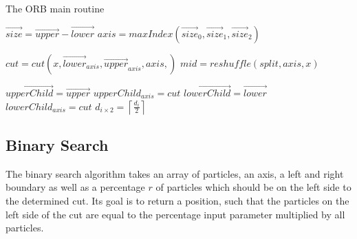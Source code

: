 \documentclass[]{article}
\begin{document}
\begin{algorithm}[H]
	\caption{The ORB main routine}\label{euclid}
	\begin{algorithmic}[1]
		\State $\vec{size} = \vec{upper} - \vec{lower}$
		\State $axis = maxIndex(\vec{size}_0, \vec{size}_1, \vec{size}_2)$ 
		\newline
		
		\State $cut = cut(x, \vec{lower}_{axis}, \vec{upper}_{axis}, axis, )$
		\State $mid = reshuffle(split, axis, x)$
		\newline
		
		\State $\vec{upperChild} = \vec{upper}$
		\State $upperChild_{axis} = cut$
		\State $\vec{lowerChild} = \vec{lower}$
		\State $lowerChild_{axis} = cut$
		\State $d_{i \times 2 } = \left \lceil\frac{d_{i}}{2} \right \rceil$
		\State {}
		\EndProcedure
	\end{algorithmic}
\end{algorithm}


\subsection{Binary Search}



 The binary search algorithm takes an array of particles, an axis, a left and right boundary as well as a percentage $r$ of particles which should be on the left side to the determined cut. Its goal is to return a position, such that the particles on the left side of the cut are equal to the percentage input parameter multiplied by all particles.
 
\end{document}
